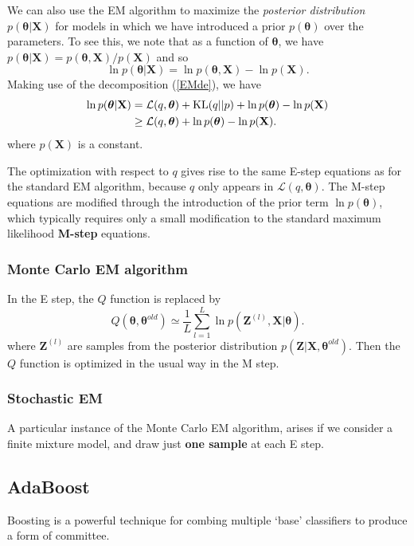 \documentclass[a4paper]{report}
\newcommand{\up}{\mathrm}
\renewcommand{\bf}{\mathbf}
\renewcommand{\cal}{\mathcal}
\newcommand{\imp}[1]{{\color{blue}\textit{#1}}}
\newcommand{\bs}{\boldsymbol}
\begin{document}
We can also use the EM algorithm to maximize the \imp{posterior distribution} $p(\bs{\theta|}\bf{X})$ for models in which we have introduced a prior $p(\bs{\theta})$ over the parameters. To see this, we note that as a function of $\bs{\theta}$, we have $p(\bs{\theta}|\bf{X}) = p(\bs{\theta},\bf{X})/p(\bf{X})$ and so
\begin{equation}
	\ln p(\bs{\theta|}\bf{X}) = \ln p(\bs{\theta},\bf{X}) - \ln p(\bf{X}).
\end{equation}
Making use of the decomposition (\ref{EMde}), we have
\begin{align}
	\ln p(\bs{\theta}|\bf{X}) &= \cal{L}(q,\bs{\theta})+\up{KL}(q||p)+\ln p(\bs{\theta}) - \ln p(\bf{X}) \notag \\
	& \geq \cal{L}(q, \bs{\theta}) + \ln p(\bs{\theta}) - \ln p(\bf{X}).
\end{align}
where $p(\bf{X})$ is a constant.

The optimization with respect to $q$ gives rise to the same E-step equations as for the standard EM algorithm, because $q$ only appears in $\cal{L}(q,\bs{\theta})$. The M-step equations are modified through the introduction of the prior term $\ln p(\bs{\theta})$, which typically requires only a small modification to the standard maximum likelihood \textbf{M-step} equations.

\subsubsection{Monte Carlo EM algorithm}
In the E step, the $Q$ function is replaced by 
\begin{equation}
	Q(\bs{\theta},\bs{\theta}^{old}) \simeq \frac{1}{L} \sum_{l=1}^L \ln p(\bf{Z}^{(l)},\bf{X}|\bs{\theta}).
\end{equation}
where $\bf{Z}^{(l)}$ are samples from the posterior distribution $p(\bf{Z|X},\bs{\theta}^{old})$. Then the $Q$ function is optimized in the usual way in the M step.
\subsubsection{Stochastic EM}
A particular instance of the Monte Carlo EM algorithm, arises if we consider a finite mixture model, and draw just \textbf{one sample} at each E step.
\subsection{AdaBoost}\label{AdaBoost}
Boosting is a powerful technique for combing multiple `base' classifiers to produce a form of committee.
\end{document}
